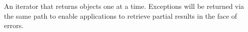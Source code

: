 An iterator that returns objects one at a time.  Exceptions will be returned via
the same path to enable applications to retrieve partial results in the face of
errors.
